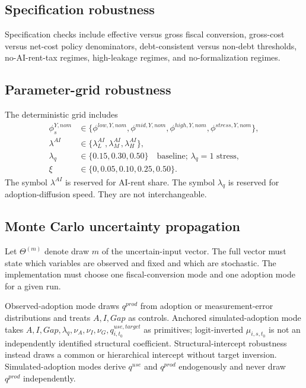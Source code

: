 \documentclass[11pt,a4paper]{article}
\begin{document}
\subsection{Specification robustness}

Specification checks include effective versus gross fiscal conversion, gross-cost versus net-cost policy denominators, debt-consistent versus non-debt thresholds, no-AI-rent-tax regimes, high-leakage regimes, and no-formalization regimes.

\subsection{Parameter-grid robustness}

The deterministic grid includes
\begin{align}
    \phi^{Y,nom}_s &\in \{\phi^{low,Y,nom},\phi^{mid,Y,nom},\phi^{high,Y,nom},\phi^{stress,Y,nom}\},\\
    \lambda^{AI} &\in \{\lambda^{AI}_L,\lambda^{AI}_M,\lambda^{AI}_H\},\\
    \lambda_q &\in \{0.15,0.30,0.50\}\quad\text{baseline; }\lambda_q=1\text{ stress},\\
    \xi &\in \{0,0.05,0.10,0.25,0.50\}.
\end{align}
The symbol $\lambda^{AI}$ is reserved for AI-rent share. The symbol $\lambda_q$ is reserved for adoption-diffusion speed. They are not interchangeable.

\subsection{Monte Carlo uncertainty propagation}\label{subsec:mc_main}

Let $\Theta^{(m)}$ denote draw $m$ of the uncertain-input vector. The full vector must state which variables are observed and fixed and which are stochastic. The implementation must choose one fiscal-conversion mode and one adoption mode for a given run.

Observed-adoption mode draws $q^{prod}$ from adoption or measurement-error distributions and treats $A,I,Gap$ as controls. Anchored simulated-adoption mode takes $A,I,Gap,\lambda_q,\nu_A,\nu_I,\nu_G,q^{use,target}_{i,t_0}$ as primitives; logit-inverted $\mu_{i,s,t_0}$ is not an independently identified structural coefficient. Structural-intercept robustness instead draws a common or hierarchical intercept without target inversion. Simulated-adoption modes derive $q^{use}$ and $q^{prod}$ endogenously and never draw $q^{prod}$ independently.
\end{document}
